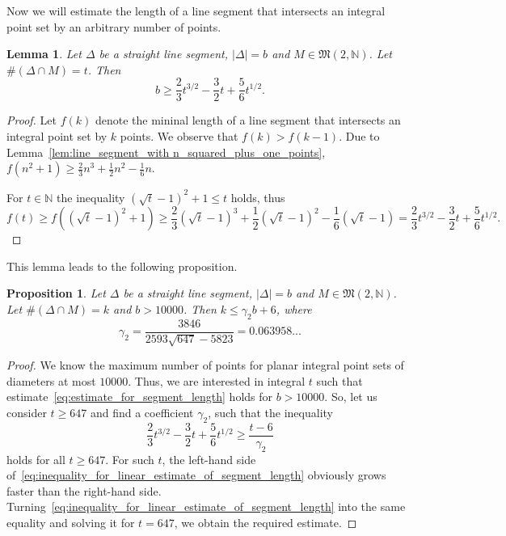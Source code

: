 \documentclass[a4paper,14pt]{article} %
\theoremstyle{plain}
\newtheorem{lemma}[theorem]{Lemma}
\newtheorem{proposition}[theorem]{Proposition}
\theoremstyle{definition}
\begin{document}
Now we will estimate the length of a line segment that intersects an integral point set
by an arbitrary number of points.

\begin{lemma}
	Let $\Delta$ be a straight line segment, $|\Delta| = b$ and $M \in \mathfrak{M}(2,\mathbb{N})$.
	Let $\#(\Delta \cap M) = t$.
	Then
	\begin{equation}
		\label{eq:estimate_for_segment_length}
		b\geq \frac{2}{3}t^{3/2}-\frac{3}{2}t+\frac{5}{6}t^{1/2}
		.
	\end{equation}
\end{lemma}

\begin{proof}
	Let $f(k)$ denote the mininal length of a line segment
	that intersects an integral point set by $k$ points.
	We observe that $f(k) > f (k-1)$.
	Due to Lemma~\ref{lem:line_segment_with n_squared_plus_one_points},
	$f(n^2+1) \geq \frac{2}{3}n^3+\frac{1}{2}n^2-\frac{1}{6}n$.

	For $t\in\mathbb{N}$ the inequality $(\sqrt{t} - 1)^2 +1 \leq t$ holds,
	thus
	\begin{equation}
		\label{eq:line_segment_length}
		f(t) \geq f((\sqrt{t} - 1)^2 +1) \geq \frac{2}{3}(\sqrt{t} - 1)^3+\frac{1}{2}(\sqrt{t} - 1)^2-\frac{1}{6}(\sqrt{t} - 1)
		=
		\frac{2}{3}t^{3/2}-\frac{3}{2}t+\frac{5 }{6}t^{1/2}
		.
	\end{equation}
\end{proof}

This lemma leads to the following proposition.

\begin{proposition}
	\label{obs:estimate_points_on_straight_line}
	Let $\Delta$ be a straight line segment, $|\Delta| = b$ and $M \in \mathfrak{M}(2,\mathbb{N})$.
	Let $\#(\Delta \cap M) = k$ and $b>10000$.
	Then $k \leq \gamma_2 b + 6$,
	where
	\begin{equation}
		\gamma_2 = \frac{3846}{2593 \sqrt{647}-5823} = 0.063958...
	\end{equation}
\end{proposition}

\begin{proof}
	We know the maximum number of points for planar integral point sets of diameters at most $10000$.
	Thus, we are interested in integral $t$ such that estimate~\eqref{eq:estimate_for_segment_length}
	holds for $b > 10000$.
	So, let us consider $t\geq 647$ and find a coefficient $\gamma_2$,
	such that the inequality
	\begin{equation}
		\label{eq:inequality_for_linear_estimate_of_segment_length}
		\frac{2}{3}t^{3/2}-\frac{3}{2}t+\frac{5 }{6}t^{1/2} \geq \frac{t-6}{\gamma_2}
	\end{equation}
	holds for all $t\geq 647$.
	For such $t$,
	the left-hand side of~\eqref{eq:inequality_for_linear_estimate_of_segment_length} obviously grows faster than the right-hand side.
	Turning~\eqref{eq:inequality_for_linear_estimate_of_segment_length} into the same equality
	and solving it for $t=647$, we obtain the required estimate.
\end{proof}
\end{document}
